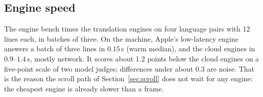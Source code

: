 \subsection{Engine speed}

The engine bench times the translation engines on four language pairs with 12 lines each, in batches of three. On the machine, Apple's low-latency
engine answers a batch of three lines in $0.15$\,s (warm median), and the cloud engines in $0.9$--$1.4$\,s, mostly network. It scores about
1.2 points below the cloud engines on a five-point scale of two model judges; differences under about $0.3$ are noise. That is the reason the scroll path of Section~\ref{sec:scroll}
does not wait for any engine: the cheapest engine is already slower than a frame.
